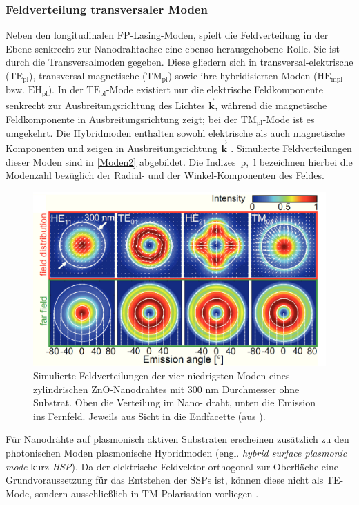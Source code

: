 \subsubsection{Feldverteilung transversaler Moden}
Neben den longitudinalen FP-Lasing-Moden, spielt die Feldverteilung in der Ebene senkrecht zur Nanodrahtachse eine ebenso herausgehobene Rolle. Sie ist durch die Transversalmoden gegeben. Diese gliedern sich in transversal-elektrische ($\text{TE}_\text{pl}$), transversal-magnetische ($\text{TM}_\text{pl}$) sowie ihre hybridisierten Moden ($\text{HE}_\text{mpl}$ bzw. $\text{EH}_\text{pl}$). In der $\text{TE}_\text{pl}$-Mode existiert nur die elektrische Feldkomponente senkrecht zur Ausbreitungsrichtung des Lichtes $\vec{\textbf{k}}$, während die magnetische Feldkomponente in Ausbreitungsrichtung zeigt; bei der $\text{TM}_\text{pl}$-Mode ist es umgekehrt. Die Hybridmoden enthalten sowohl elektrische als auch magnetische Komponenten und zeigen in Ausbreitungsrichtung $\vec{\textbf{k}}$ \cite{Kneubuhl.2008}. Simulierte Feldverteilungen dieser Moden sind in \autoref{Moden2} abgebildet. Die \mbox{Indizes p, l} bezeichnen hierbei die Modenzahl bezüglich der Radial- und der Winkel-Komponenten des Feldes.\begin{figure}[h]
\centering
\includegraphics[width=.5\textwidth]{Bilder/Vorbetrachtung/moden2}
\caption[Feldverteilung der Moden eines ZnO-Nanodrahtes]{Simulierte Feldverteilungen der vier niedrigsten Moden eines zylindrischen ZnO-Nanodrahtes mit 300 nm Durchmesser ohne Substrat. Oben die Verteilung im Nano- draht, unten die Emission ins Fernfeld. Jeweils aus Sicht in die Endfacette (aus \cite{Roeder.Diss}).}
\label{Moden2}
\end{figure}Für Nanodrähte auf plasmonisch aktiven Substraten erscheinen zusätzlich zu den photonischen Moden plasmonische Hybridmoden (engl. \textit{hybrid surface plasmonic mode} kurz \textit{HSP}). Da der elektrische Feldvektor orthogonal zur Oberfläche eine Grundvoraussetzung für das Entstehen der SSPs ist, können diese nicht als TE-Mode, sondern ausschließlich in TM Polarisation vorliegen \cite{Maier.2010}. 
